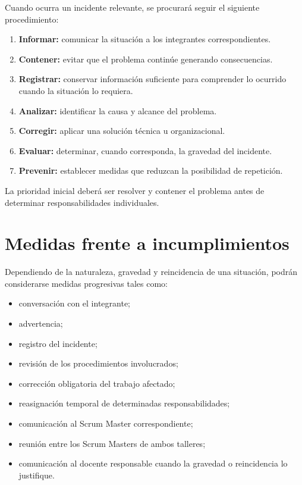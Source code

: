 \documentclass[12pt,a4paper]{article}
\begin{document}
Cuando ocurra un incidente relevante, se procurará seguir el siguiente procedimiento:

\begin{enumerate}
    \item \textbf{Informar:} comunicar la situación a los integrantes correspondientes.

    \item \textbf{Contener:} evitar que el problema continúe generando consecuencias.

    \item \textbf{Registrar:} conservar información suficiente para comprender lo ocurrido cuando la situación lo requiera.

    \item \textbf{Analizar:} identificar la causa y alcance del problema.

    \item \textbf{Corregir:} aplicar una solución técnica u organizacional.

    \item \textbf{Evaluar:} determinar, cuando corresponda, la gravedad del incidente.

    \item \textbf{Prevenir:} establecer medidas que reduzcan la posibilidad de repetición.
\end{enumerate}

La prioridad inicial deberá ser resolver y contener el problema antes de determinar responsabilidades individuales.

\section{Medidas frente a incumplimientos}

Dependiendo de la naturaleza, gravedad y reincidencia de una situación, podrán considerarse medidas progresivas tales como:

\begin{itemize}
    \item conversación con el integrante;
    \item advertencia;
    \item registro del incidente;
    \item revisión de los procedimientos involucrados;
    \item corrección obligatoria del trabajo afectado;
    \item reasignación temporal de determinadas responsabilidades;
    \item comunicación al Scrum Master correspondiente;
    \item reunión entre los Scrum Masters de ambos talleres;
    \item comunicación al docente responsable cuando la gravedad o reincidencia lo justifique.
\end{itemize}
\end{document}
